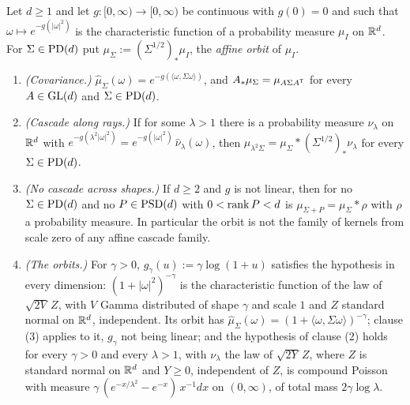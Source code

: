 \begin{proposition}
\label{prop:affine-orbits}
\leanok
Let $d \ge 1$ and let $g : [0,\infty) \to [0,\infty)$ be continuous with $g(0) = 0$ and such that
$\omega \mapsto e^{-g(|\omega|^2)}$ is the characteristic function of a probability measure
$\mu_I$ on $\mathbb{R}^d$. For $\Sigma \in \mathrm{PD}(d)$ put $\mu_\Sigma := (\Sigma^{1/2})_*\mu_I$, the
\emph{affine orbit} of $\mu_I$.
\begin{enumerate}
\item \emph{(Covariance.)} $\widehat\mu_\Sigma(\omega) = e^{-g(\langle\omega,\Sigma\omega\rangle)}$,
and $A_*\mu_\Sigma = \mu_{A\Sigma A^{\mathsf{T}}}$ for every $A \in \mathrm{GL}(d)$ and $\Sigma \in \mathrm{PD}(d)$.
\item \emph{(Cascade along rays.)} If for some $\lambda > 1$ there is a probability measure
$\nu_\lambda$ on $\mathbb{R}^d$ with $e^{-g(\lambda^2|\omega|^2)} = e^{-g(|\omega|^2)}\,\widehat\nu_\lambda(\omega)$,
then $\mu_{\lambda^2\Sigma} = \mu_\Sigma * (\Sigma^{1/2})_*\nu_\lambda$ for every
$\Sigma \in \mathrm{PD}(d)$.
\item \emph{(No cascade across shapes.)} If $d \ge 2$ and $g$ is not linear, then for no
$\Sigma \in \mathrm{PD}(d)$ and no $P \in \mathrm{PSD}(d)$ with $0 < \operatorname{rank} P < d$ is
$\mu_{\Sigma+P} = \mu_\Sigma * \rho$ with $\rho$ a probability measure. In particular the orbit is
not the family of kernels from scale zero of any affine cascade family.
\item \emph{(The \Matern{} orbits.)} For $\gamma > 0$, $g_\gamma(u) := \gamma\log(1+u)$ satisfies
the hypothesis in every dimension: $(1+|\omega|^2)^{-\gamma}$ is the characteristic function of
the law of $\sqrt{2V}\,Z$, with $V$ Gamma distributed of shape $\gamma$ and scale $1$ and $Z$
standard normal on $\mathbb{R}^d$, independent. Its orbit has
$\widehat\mu_\Sigma(\omega) = (1 + \langle\omega,\Sigma\omega\rangle)^{-\gamma}$; clause (3)
applies to it, $g_\gamma$ not being linear; and the hypothesis of clause (2) holds for every
$\gamma > 0$ and every $\lambda > 1$, with $\nu_\lambda$ the law of $\sqrt{2Y}\,Z$, where $Z$ is
standard normal on $\mathbb{R}^d$ and $Y \ge 0$, independent of $Z$, is compound Poisson with \Levy{}
measure $\gamma\,(e^{-x/\lambda^2} - e^{-x})\,x^{-1}dx$ on $(0,\infty)$, of total mass
$2\gamma\log\lambda$.
\end{enumerate}

\end{proposition}
